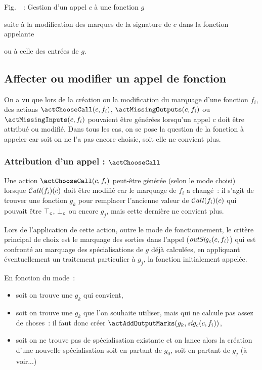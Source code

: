 \clearpage
\begin{center}

Fig.~\thefigure~:\label{fig-modifcall} 
Gestion d'un appel $c$ à une fonction $g$

suite à la modification des marques de la signature de $c$ dans la fonction appelante

ou à celle des entrées de $g$.
\end{center}
\clearpage

\subsection{Affecter ou modifier un appel de fonction}

On a vu que lors de la création ou la modification du marquage d'une fonction
$f_i$, des actions $\actChooseCall(c, f_i)$, 
$\actMissingOutputs(c, f_i)$ ou
$\actMissingInputs(c, f_i)$ pouvaient être générées lorsqu'un appel $c$
doit être attribué ou modifié.
Dans tous les cas, on se pose la question de la fonction à appeler car soit on
ne l'a pas encore choisie, soit elle ne convient plus. 
\bb

\subsubsection{Attribution d'un appel : $\actChooseCall$}

Une action $\actChooseCall(c, f_i)$ peut-être générée (selon le mode choisi)
lorsque
$\operatorname{\mathcal{C\mathit{all}}}(f_i)(c)$ doit être modifié car le marquage de $f_i$ a changé~: 
il s'agit de trouver une fonction $g_k$ pour remplacer l'ancienne valeur de
$\operatorname{\mathcal{C\mathit{all}}}(f_i)(c)$ qui pouvait être ${\top}_c$, ${\bot}_c$ ou encore $g_j$,
mais cette dernière ne convient plus.
\bb

Lors de l'application de cette action, outre le mode de fonctionnement,
le critère principal de choix est le marquage des sorties dans l'appel 
($\mathit{outSig_c}(c, f_i)$) qui est confronté  
au marquage des spécialisations de $g$ déjà calculées,
en appliquant éventuellement un traitement particulier à $g_j$,
la fonction initialement appelée.

En fonction du mode~:
\begin{itemize}
  \item soit on trouve une $g_k$ qui convient,
  \item soit on trouve une $g_k$ que l'on souhaite utiliser,
    mais qui ne calcule pas assez de choses~: 
    il faut donc créer $\actAddOutputMarks (g_k, \sigc(c, f_i))$,
  \item soit on ne trouve pas de spécialisation existante et on lance alors la
    création d'une nouvelle spécialisation soit en partant de $g_0$, soit en
    partant de $g_j$ (à voir...)
\end{itemize}
\bb

